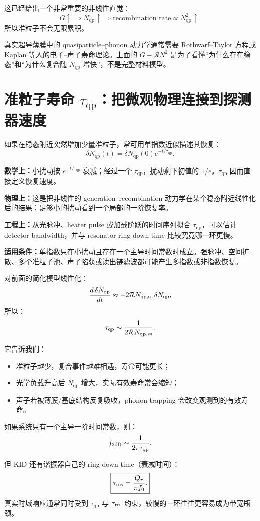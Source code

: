 \documentclass[11pt,a4paper,openany]{ctexrep}
\newcommand{\formulaexplain}[4]{%
\begin{formulaguidebox}
\textbf{\color{KidBlue}数学上：}#1\par
\textbf{\color{KidTeal}物理上：}#2\par
\textbf{\color{KidGold!55!black}工程上：}#3\par
\textbf{\color{KidRed}适用条件：}#4
\end{formulaguidebox}%
}
\newcommand{\qp}{\mathrm{qp}}
\begin{document}
这已经给出一个非常重要的非线性直觉：
\[
G\uparrow
\Rightarrow
N_{\qp}\uparrow
\Rightarrow
\text{recombination rate}\propto N_{\qp}^2\uparrow.
\]
所以准粒子不会无限累积。

\begin{mistakebox}
真实超导薄膜中的 quasiparticle--phonon 动力学通常需要 Rothwarf--Taylor 方程或 Kaplan 等人的电子--声子寿命理论。上面的 $G-\mathcal{R}N^2$ 是为了看懂“为什么存在稳态”和“为什么复合随 $N_{\qp}$ 增快”，不是完整材料模型。
\end{mistakebox}

\section{准粒子寿命 $\tau_{\qp}$：把微观物理连接到探测器速度}

如果在稳态附近突然增加少量准粒子，常可用单指数近似描述其恢复：
\[
\boxed{
\delta N_{\qp}(t)
=
\delta N_{\qp}(0)e^{-t/\tau_{\qp}}.
}
\]
\formulaexplain
{小扰动按 $e^{-t/\tau_{\qp}}$ 衰减；经过一个 $\tau_{\qp}$，扰动剩下初值的 $1/e$。$\tau_{\qp}$ 因而直接定义恢复速度。}
{这是把非线性的 generation--recombination 动力学在某个稳态附近线性化后的结果：足够小的扰动看到一个局部的一阶恢复率。}
{从光脉冲、heater pulse 或加载阶跃的时间序列拟合 $\tau_{\qp}$，可以估计 detector bandwidth，并与 resonator ring-down time 比较究竟哪一环更慢。}
{单指数只在小扰动且存在一个主导时间常数时成立。强脉冲、空间扩散、多个准粒子池、声子陷获或读出链滤波都可能产生多指数或非指数恢复。}


对前面的简化模型线性化：
\[
\frac{d\,\delta N_{\qp}}{dt}
\approx
-2\mathcal{R}N_{\qp,\rm ss}\,\delta N_{\qp},
\]
所以：
\[
\tau_{\qp}
\sim
\frac{1}{2\mathcal{R}N_{\qp,\rm ss}}.
\]

它告诉我们：
\begin{itemize}
  \item 准粒子越少，复合事件越难相遇，寿命可能更长；
  \item 光学负载升高后 $N_{\qp}$ 增大，实际有效寿命常会缩短；
  \item 声子若被薄膜/基底结构反复吸收，phonon trapping 会改变观测到的有效寿命。
\end{itemize}

如果系统只有一个主导一阶时间常数，则：
\[
f_{\rm 3dB}\sim\frac{1}{2\pi\tau_{\qp}}.
\]

但 KID 还有谐振器自己的 ring-down time（衰减时间）：
\[
\boxed{
\tau_{\rm res}
=
\frac{Q_r}{\pi f_0}.
}
\]
真实时域响应通常同时受到 $\tau_{\qp}$ 与 $\tau_{\rm res}$ 约束，较慢的一环往往更容易成为带宽瓶颈。
\end{document}
